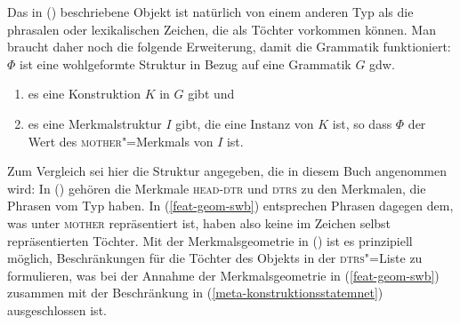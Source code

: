 \z
Das in () beschriebene Objekt ist natürlich von einem anderen Typ
als die phrasalen oder lexikalischen Zeichen, die als Töchter vorkommen können. Man braucht daher
noch die folgende Erweiterung, damit die Grammatik funktioniert:
\ea
\label{meta-konstruktionsstatemnet}
$\Phi$ ist eine wohlgeformte Struktur in Bezug auf eine Grammatik $G$ gdw.\
\begin{enumerate}
\item es eine Konstruktion $K$ in $G$ gibt und
\item es eine Merkmalstruktur $I$ gibt, die eine Instanz von $K$ ist, so dass
      $\Phi$ der Wert des \textsc{mother}"=Merkmals von $I$ ist.
\end{enumerate}
\z
Zum Vergleich sei hier die Struktur angegeben, die in diesem Buch angenommen wird:
\ea
\label{feat-geom-Müller}
\z
In () gehören die Merkmale \textsc{head-dtr} und \textsc{dtrs} zu den Merkmalen, die
\zb Phrasen vom Typ \type{head"=complement"=phrase} haben. In (\ref{feat-geom-swb}) entsprechen
Phrasen dagegen dem, was unter \textsc{mother} repräsentiert ist, haben also keine im Zeichen selbst
repräsentierten Töchter. Mit der Merkmalsgeometrie in (\mex{0}) ist es prinzipiell möglich,
Beschränkungen für die Töchter des Objekts in der \textsc{dtrs}"=Liste zu formulieren, was bei
der Annahme der Merkmalsgeometrie in (\ref{feat-geom-swb}) zusammen mit der Beschränkung in
(\ref{meta-konstruktionsstatemnet}) ausgeschlossen ist. 

